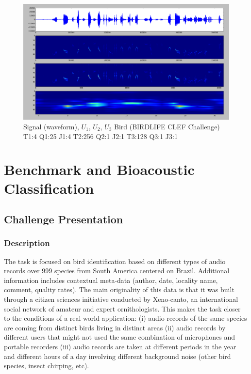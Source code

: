 \documentclass[a4paper]{report}
\begin{document}
\begin{figure}[H]
\begin{center}
\includegraphics[scale=0.21]{bird.png}\caption{Signal (waveform), $U_1$, $U_2$, $U_3$ Bird (BIRDLIFE CLEF Challenge) T1:4 Q1:25 J1:4 T2:256 Q2:1 J2:1 T3:128 Q3:1 J3:1}
\end{center}
\end{figure}
\part{Benchmark and Bioacoustic Classification}

\chapter{Challenge Presentation}

\section{Description}

The task is focused on bird identification based on different types of audio records over 999 species from South America centered on Brazil. Additional information includes contextual meta-data (author, date, locality name, comment, quality rates). The main originality of this data is that it was built through a citizen sciences initiative conducted by Xeno-canto, an international social network of amateur and expert ornithologists. This makes the task closer to the conditions of a real-world application: (i) audio records of the same species are coming from distinct birds living in distinct areas (ii) audio records by different users that might not used the same combination of microphones and portable recorders (iii) audio records are taken at different periods in the year and different hours of a day involving different background noise (other bird species, insect chirping, etc).
\end{document}
